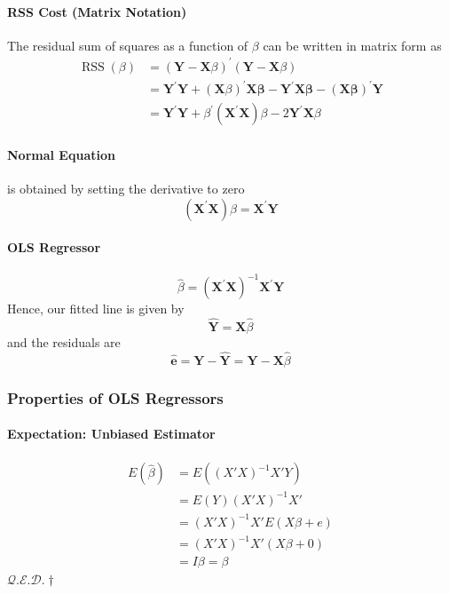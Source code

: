 \documentclass[10pt]{article}
\newcommand{\qed}{\hfill $\mathcal{Q}.\mathcal{E}.\mathcal{D}.\dagger$}
\begin{document}
\paragraph{RSS Cost (Matrix Notation)}
The residual sum of squares as a function of $\beta$ can be written in matrix form as
\begin{align*}
    \operatorname{RSS}(\beta)
    &=(\mathbf{Y}-\mathbf{X} \beta)^{\prime}(\mathbf{Y}-\mathbf{X} \beta) \\
    &= \mathbf{Y}^{\prime} \mathbf{Y}+(\mathbf{X} \beta)^{\prime} \mathbf{X} \boldsymbol{\beta}-\mathbf{Y}^{\prime} \mathbf{X} \boldsymbol{\beta}-(\mathbf{X} \boldsymbol{\beta})^{\prime} \mathbf{Y} \\
    &= \mathbf{Y}^{\prime} \mathbf{Y}+\beta^{\prime}\left(\mathbf{X}^{\prime} \mathbf{X}\right) \beta-2 \mathbf{Y}^{\prime} \mathbf{X} \beta
\end{align*}
\paragraph{Normal Equation} is obtained by setting the derivative to zero
\begin{equation*}
    \left(\mathbf{X}^{\prime} \mathbf{X}\right) \beta=\mathbf{X}^{\prime} \mathbf{Y}
\end{equation*}
\paragraph{OLS Regressor}
\begin{equation*}
    \hat{\beta}=\left(\mathbf{X}^{\prime} \mathbf{X}\right)^{-1} \mathbf{X}^{\prime} \mathbf{Y}
\end{equation*}
Hence, our fitted line is given by
\begin{equation*}
    \hat{\mathbf{Y}}=\mathbf{X} \hat{\beta}
\end{equation*}
and the residuals are
\begin{equation*}
    \hat{\mathbf{e}}=\mathbf{Y}-\hat{\mathbf{Y}}=\mathbf{Y}-\mathbf{X} \hat{\beta}
\end{equation*}


\subsubsection{Properties of OLS Regressors}
\paragraph{Expectation: Unbiased Estimator}
\begin{align*}
    E(\hat{\beta}) &= E((X'X)^{-1}X'Y) \\
    &= E(Y)(X'X)^{-1}X' \\
    &= (X'X)^{-1}X' E(X\beta + e) \\
    &= (X'X)^{-1}X' (X\beta + 0) \\
    &= I\beta = \beta
\end{align*}
\qed
\end{document}

